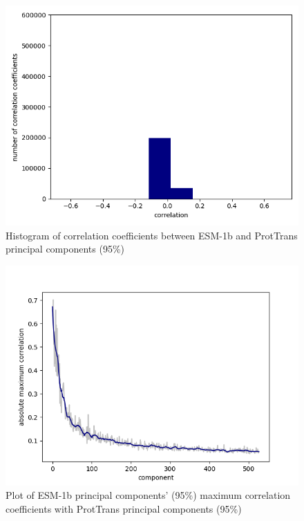 \documentclass[12pt]{article}
\begin{document}
	\newpage

	\begin{figure}[h!]
		\centering
		\includegraphics[scale=0.85]{validation_small_set_2_joined_PC_95_correlation_hist.png}

		\caption{Histogram of correlation coefficients between ESM-1b 
		and ProtTrans principal components (95\%)}
		\label{figure:correlationComponentsHistoPC95}
	\end{figure}

	\newpage

	\begin{figure}[h!]
		\centering
		\includegraphics[scale=0.85]{validation_small_set_2_joined_PC_95_correlation_max.png}

		\caption{Plot of ESM-1b principal components' (95\%) maximum correlation 
		coefficients with ProtTrans principal components (95\%)}
		\label{figure:correlationComponentsMaxPC95}
	\end{figure}
\end{document}
